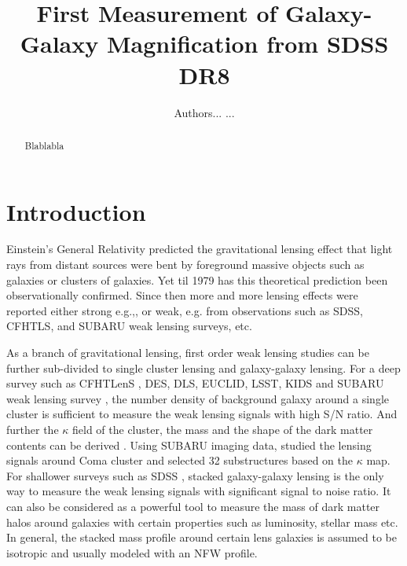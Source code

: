 \documentclass[apj]{emulateapj}
\begin{document}

\title{First Measurement of Galaxy-Galaxy Magnification from SDSS DR8}

\author{Authors... ... }





\begin{abstract}
  Blablabla
\end{abstract}




\section{Introduction}
\label{sec_intro}

Einstein's General Relativity predicted the gravitational lensing
effect that light rays from distant sources were bent by foreground
massive objects such as galaxies or clusters of galaxies. Yet til
1979 \citep{Walsh1979} has this theoretical prediction been
observationally confirmed. Since then more and more lensing effects
were reported either strong e.g.,\citet{Oguri2002, Kneib2004}, or
weak, e.g. \citet{Sheldon2004, Mandelbaum2005, Mandelbaum2006, Fu2008,
  Bernstein2009,Cacciato2009, Oguri2009, George2012, Li2013,
  Mandelbaum2013, Li2014} from observations such as SDSS, CFHTLS, and
SUBARU weak lensing surveys, etc.


As a branch of gravitational lensing, first order weak lensing studies can be
further sub-divided to single cluster lensing and galaxy-galaxy
lensing. For a deep survey such as CFHTLenS \citep{Heymans2012}, 
DES\citep{Jarvis2015}, DLS\citep{Wittman2006}, EUCLID\citep{Refregier2010},
LSST\citep{LSST2009}, KIDS\citep{Kuijken2015}
and SUBARU weak lensing survey \citep{Kaifu1998, Umetsu2007}, the number
density of background galaxy around a single cluster is sufficient to
measure the weak lensing signals with high S/N ratio. And further the
$\kappa$ field of the cluster, the mass and the shape of the dark
matter contents can be derived \citep{Oguri2010}. Using SUBARU imaging
data, \citet{Okabe2014} studied the lensing signals around Coma
cluster and selected 32 substructures based on the $\kappa$ map.  For
shallower surveys such as SDSS \citep{York2000}, stacked galaxy-galaxy
lensing is the only way to measure the weak lensing signals with
significant signal to noise ratio. It can also be considered as a
powerful tool to measure the mass of dark matter halos around galaxies
with certain properties such as luminosity, stellar mass etc.  In
general, the stacked mass profile around certain lens galaxies is
assumed to be isotropic and usually modeled with an NFW
\citep{NFW1997} profile.
\end{document}
